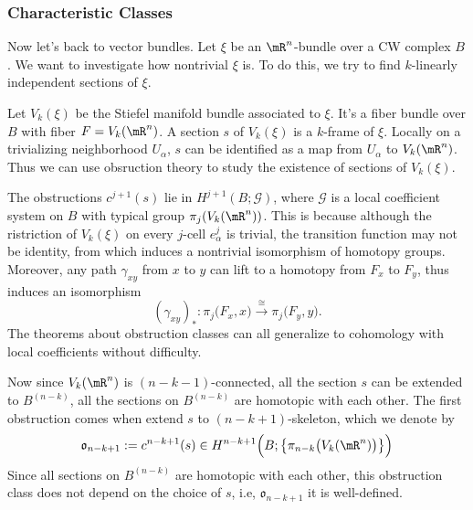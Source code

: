 \subsubsection*{Characteristic Classes}
Now let's back to vector bundles. Let $\xi$ be an $\mR^n$-bundle over a CW 
complex $B$. We want to investigate how nontrivial $\xi$ is. To do this, we 
try to find $k$-linearly independent sections of $\xi$. 


Let $V_k(\xi)$ be the Stiefel manifold bundle associated to $\xi$. 
It's a fiber bundle over $B$ with fiber $F=V_k(\mR^n)$. A section $s$ of 
$V_k(\xi)$ is a $k$-frame of $\xi$. Locally on a trivializing
neighborhood $U_\alpha$, $s$ can be identified as a map from $U_\alpha$ to
$V_k(\mR^n)$. Thus we can use obsruction theory to study the existence of
sections of $V_k(\xi)$. 

The obstructions $c^{j+1}(s)$ lie in $H^{j+1}(B;\mathcal{G})$, where 
$\mathcal{G}$ is a local coefficient system on $B$ with typical group 
$\pi_j(V_k(\mR^n))$. This is because although the ristriction of $V_k(\xi)$ 
on every $j$-cell $e^j_\alpha$ is trivial, the transition function may not 
be identity, from which induces a nontrivial isomorphism of homotopy groups. 
Moreover, any path $\gamma_{xy}$ from $x$ to $y$ can lift to a homotopy 
from $F_x$ to $F_y$, thus induces an isomorphism 
\begin{equation*}
    (\gamma_{xy})_*:\pi_j\big(F_x,x\big)
    \overset{\cong}{\to}\pi_j\big(F_y,y\big).
\end{equation*}
The theorems about obstruction classes can all generalize to cohomology with 
local coefficients without difficulty. 

Now since $V_k(\mR^n)$ is $(n-k-1)$-connected, all the section $s$ can be 
extended to $B^{(n-k)}$, all the sections on $B^{(n-k)}$ are homotopic with 
each other. The first obstruction comes when extend $s$ to 
$(n-k+1)$-skeleton, which we denote by 
\begin{equation*}
    \mathfrak{o}_{n-k+1}:=c^{n-k+1}(s)\in 
    H^{n-k+1}\Big(B;\big\{\pi_{n-k}\big(V_k(\mR^n)\big)\big\}\Big)
\end{equation*}
Since all sections on $B^{(n-k)}$ are homotopic with each other, this 
obstruction class does not depend on the choice of $s$, i.e, 
$\mathfrak{o}_{n-k+1}$ it is well-defined. 

